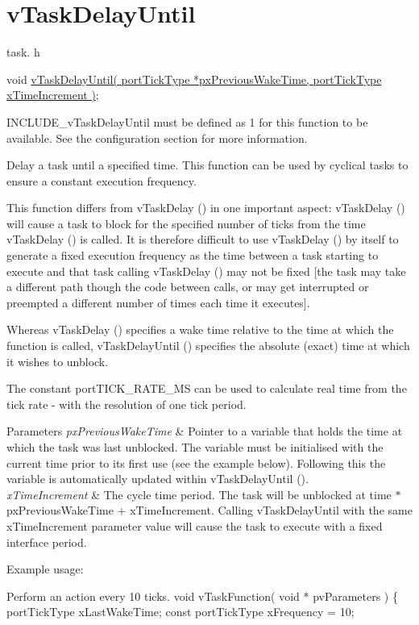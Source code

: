 \hypertarget{group__v_task_delay_until}{\section{v\-Task\-Delay\-Until}
\label{group__v_task_delay_until}
}
task. h 
\begin{DoxyPre}void \hyperlink{win32_2win32_2_libraries_2_free_r_t_o_s_2_source_2tasks_8c_aa0aef01343148471ad053924cfd37901}{vTaskDelayUntil( portTickType *pxPreviousWakeTime, portTickType xTimeIncrement )};\end{DoxyPre}


I\-N\-C\-L\-U\-D\-E\-\_\-v\-Task\-Delay\-Until must be defined as 1 for this function to be available. See the configuration section for more information.

Delay a task until a specified time. This function can be used by cyclical tasks to ensure a constant execution frequency.

This function differs from v\-Task\-Delay () in one important aspect\-: v\-Task\-Delay () will cause a task to block for the specified number of ticks from the time v\-Task\-Delay () is called. It is therefore difficult to use v\-Task\-Delay () by itself to generate a fixed execution frequency as the time between a task starting to execute and that task calling v\-Task\-Delay () may not be fixed \mbox{[}the task may take a different path though the code between calls, or may get interrupted or preempted a different number of times each time it executes\mbox{]}.

Whereas v\-Task\-Delay () specifies a wake time relative to the time at which the function is called, v\-Task\-Delay\-Until () specifies the absolute (exact) time at which it wishes to unblock.

The constant port\-T\-I\-C\-K\-\_\-\-R\-A\-T\-E\-\_\-\-M\-S can be used to calculate real time from the tick rate -\/ with the resolution of one tick period.


\begin{DoxyParams}{Parameters}
{\em px\-Previous\-Wake\-Time} & Pointer to a variable that holds the time at which the task was last unblocked. The variable must be initialised with the current time prior to its first use (see the example below). Following this the variable is automatically updated within v\-Task\-Delay\-Until ().\\
\hline
{\em x\-Time\-Increment} & The cycle time period. The task will be unblocked at time $\ast$px\-Previous\-Wake\-Time + x\-Time\-Increment. Calling v\-Task\-Delay\-Until with the same x\-Time\-Increment parameter value will cause the task to execute with a fixed interface period.\\
\hline
\end{DoxyParams}
Example usage\-: 
\begin{DoxyPre}
Perform an action every 10 ticks.
 void vTaskFunction( void * pvParameters )
 \{
 portTickType xLastWakeTime;
 const portTickType xFrequency = 10;\end{DoxyPre}




